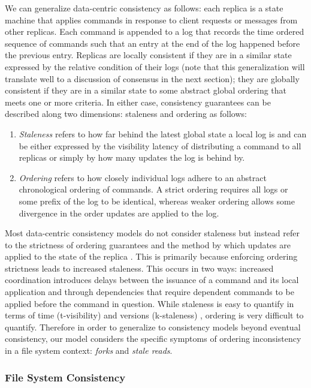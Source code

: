 \documentclass{article}
\begin{document}
We can generalize data-centric consistency as follows: each replica is a state machine that applies commands in response to client requests or messages from other replicas. Each command is appended to a log that records the time ordered sequence of commands such that an entry at the end of the log happened before the previous entry. Replicas are locally consistent if they are in a similar state expressed by the relative condition of their logs (note that this generalization will translate well to a discussion of consensus in the next section); they are globally consistent if they are in a similar state to some abstract global ordering that meets one or more criteria. In either case, consistency guarantees can be described along two dimensions: staleness and ordering as follows:

\begin{enumerate}
    \item \textit{Staleness} refers to how far behind the latest global state a local log is and can be either expressed by the visibility latency of distributing a command to all replicas or simply by how many updates the log is behind by.
    \item \textit{Ordering} refers to how closely individual logs adhere to an abstract chronological ordering of commands. A strict ordering requires all logs or some prefix of the log to be identical, whereas weaker ordering allows some divergence in the order updates are applied to the log.
\end{enumerate}

Most data-centric consistency models do not consider staleness but instead refer to the strictness of ordering guarantees and the method by which updates are applied to the state of the replica \cite{tanenbaum_distributed_2007}. This is primarily because enforcing ordering strictness leads to increased staleness. This occurs in two ways: increased coordination introduces delays between the issuance of a command and its local application and through dependencies that require dependent commands to be applied before the command in question. While staleness is easy to quantify in terms of time (t-visibility) and versions (k-staleness) \cite{bailis_quantifying_2014}, ordering is very difficult to quantify. Therefore in order to generalize to consistency models beyond eventual consistency, our model considers the specific symptoms of ordering inconsistency in a file system context: \textit{forks} and \textit{stale reads}.

\subsubsection{File System Consistency}
\label{sec:fs_consistency}
\end{document}

